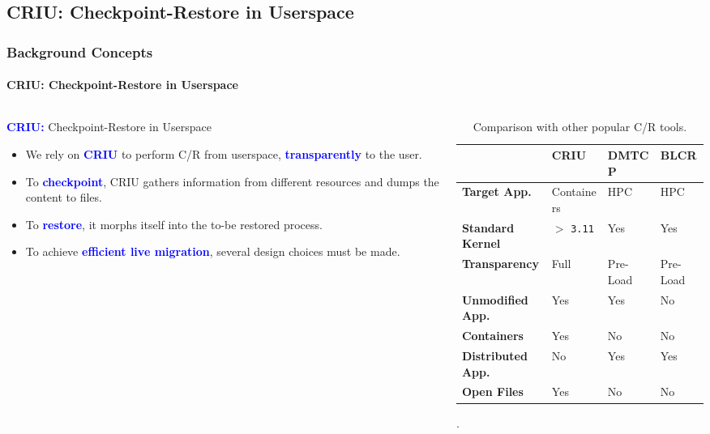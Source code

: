 \documentclass[9pt,    %
    english,            %
    xcolor=table,       %
    envcountsect,        %
    aspectratio=169     %
]{beamer}
\begin{document}
\subsection{\textsc{CRIU}: Checkpoint-Restore in Userspace}

\begin{frame}
    \frametitle{Background Concepts}
    \framesubtitle{\textsc{CRIU}: Checkpoint-Restore in Userspace}

    \begin{columns}[t]
        \begin{column}{.5\textwidth}
            \textbf{\textcolor{blue}{CRIU:}} Checkpoint-Restore in Userspace 
            \begin{itemize}
                \item We rely on \textbf{\textcolor{blue}{CRIU}} to perform C/R from userspace, \textbf{\textcolor{blue}{transparently}} to the user.
                \item To \textbf{\textcolor{blue}{checkpoint}}, CRIU gathers information from different resources and dumps the content to files.
                \item To \textbf{\textcolor{blue}{restore}}, it morphs itself into the to-be restored process.
                \item To achieve \textbf{\textcolor{blue}{efficient live migration}}, several design choices must be made.
            \end{itemize}
        \end{column}
        \begin{column}{.50\textwidth}
            \begin{table}
                \centering
                {\scriptsize
                \begin{tabular}{p{1.7cm}p{1.1cm}p{1.1cm}p{1.1cm}}
                    \rowcolor{blue!50} \hline & \textbf{CRIU} & \textbf{DMTCP} & \textbf{BLCR} \\[3pt]
                    \hline \hline \textbf{Target App.} & Containers & HPC & HPC \\[3pt]
                    \textbf{Standard Kernel} & $>$ \texttt{3.11} & Yes & Yes \\[3pt]
                    \textbf{Transparency} &  Full & Pre-Load & Pre-Load \\[3pt]
                    \textbf{Unmodified App.} & Yes & Yes & No \\[3pt]
                    \textbf{Containers} & Yes & No & No \\[3pt]
                    \textbf{Distributed App.} & No & Yes & Yes \\[3pt]
                    \textbf{Open Files} & Yes & No & No \\[3pt] \hline
                \end{tabular}
                }
                \caption{Comparison with other popular C/R tools.\label{table:filter}}.
            \end{table}
        \end{column}
    \end{columns}
\end{frame}
\end{document}
